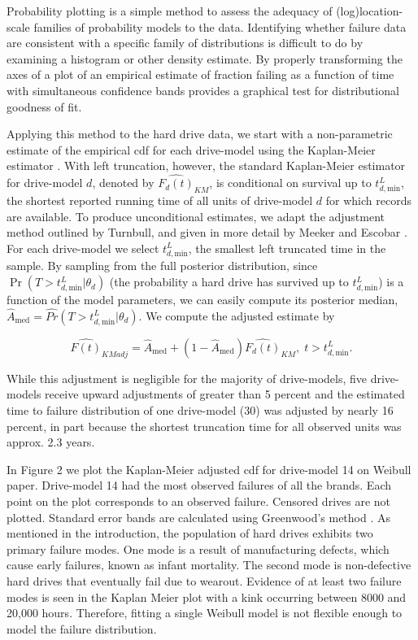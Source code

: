 \documentclass[12pt]{article}
\begin{document}
Probability plotting is a simple method to assess the adequacy of (log)location-scale families of probability models to the data.  Identifying whether failure data are consistent with a specific family of distributions is difficult to do by examining a histogram or other density estimate.  By properly transforming the axes of a plot of an empirical estimate of fraction failing as a function of time with simultaneous confidence bands provides a graphical test for distributional goodness of fit.  

Applying this method to the hard drive data, we start with a non-parametric estimate of the empirical cdf for each drive-model using the Kaplan-Meier estimator
\cite{kaplan}.  With left truncation, however, the standard Kaplan-Meier estimator for drive-model $d$, denoted by
$\widehat{F_d(t)}_{KM}$, is conditional on survival up to
$t_{d,\text{min}}^L$, the shortest reported running time of all units
of drive-model $d$ for which records are available. To produce
unconditional estimates, we adapt the adjustment method outlined by
Turnbull, and given in more detail by Meeker and Escobar
\cite{turnbull,meeker}.  For each drive-model we select
$t_{d,\text{min}}^L$, the smallest left truncated time in the sample.
By sampling from the full posterior distribution, since
$\Pr(T>t_{d,\text{min}}^L|\theta_d)$ (the probability a hard drive has
survived up to $t_{d,\text{min}}^L$) is a function of the model
parameters, we can easily compute its posterior median,
$\widehat{A}_{\text{med}} = \widehat{Pr}(T>t_{d,\text{min}}^L|\theta_d)$. We compute the adjusted estimate by

$$\widehat{F(t)}_{KMadj} = \widehat{A}_{\text{med}} + \left(1 - \widehat{A}_{\text{med}}\right)\widehat{F_d(t)}_{KM},\; t>t_{d,\text{min}}^L.$$

While this adjustment is negligible for the majority of drive-models, five drive-models receive upward adjustments of greater than 5 percent and the estimated time to failure distribution of one drive-model (30) was adjusted by nearly 16 percent, in part because the shortest truncation time for all observed units was approx. 2.3 years.


In Figure 2 we plot the Kaplan-Meier adjusted cdf for drive-model 14 on Weibull paper.  Drive-model 14 had the most observed failures of all the brands.  Each point on the plot corresponds to an observed failure.  Censored drives are not plotted.  Standard error bands are calculated using Greenwood's method \cite{green}.  As mentioned in the introduction, the population of hard drives exhibits two primary failure modes.  One mode is a result of manufacturing defects, which cause early failures, known as infant mortality.  The second mode is non-defective hard drives that eventually fail due to wearout.   Evidence of at least two failure modes is seen in the Kaplan Meier plot with a kink occurring between 8000 and 20,000 hours.  Therefore, fitting a single Weibull model is not flexible enough to model the failure distribution.
\end{document}
